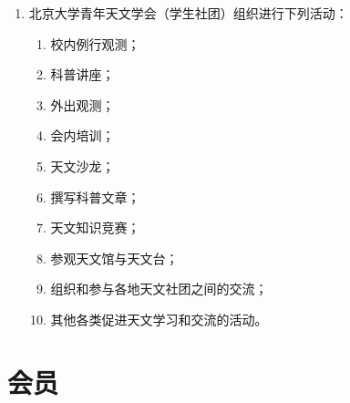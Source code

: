 \begin{enumerate}[resume]
    \item 北京大学青年天文学会（学生社团）组织进行下列活动：
    
    \begin{enumerate}
        \item 校内例行观测；
        \item 科普讲座；
        \item 外出观测；
        \item 会内培训；
        \item 天文沙龙；
        \item 撰写科普文章；
        \item 天文知识竞赛；
        \item 参观天文馆与天文台；
        \item 组织和参与各地天文社团之间的交流；
        \item 其他各类促进天文学习和交流的活动。
    \end{enumerate}
    
\end{enumerate}

\section{会员}

